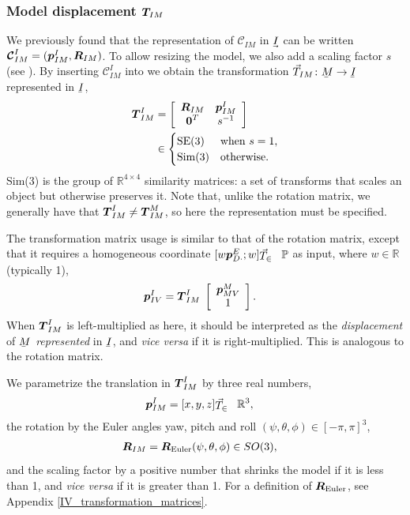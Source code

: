 \subsubsection{Model displacement $\boldsymbol{T}_{\!IM}$}

We previously found that the representation of $\mathcal{C}_{IM}$ in $\uvec{I}$ can be written $\boldsymbol{\mathcal{C}}_{IM}^I = (\boldsymbol{p}_{IM}^I,\boldsymbol{R}_{IM})$. To allow resizing the model, we also add a scaling factor $s$ (see ). By inserting $\boldsymbol{\mathcal{C}}_{IM}^I$ into  we obtain the transformation $\vec{T}_{IM}\colon \ubar{M}\to\ubar{I}$ represented in $\ubar{I}$,
%
\begin{align}
\dvec{T}_{IM}^I &= 
\left[\begin{array}{c c}
 \mat{R}_{IM}  & \dvec{p}_{IM}^I \\%
 \dvec{0}^T  &  s^{-1}
\end{array}\right] \nn &\in
\begin{cases}
\mathrm{SE}(3) & \mathrm{when}\ s=1,\\
\mathrm{Sim}(3) & \mathrm{otherwise}.
\end{cases} \label{eq_T_IM}
\end{align}
%
Sim(3) is the group of $\mathbb{R}^{4\times4}$ similarity matrices: a set of transforms that scales an object but otherwise preserves it. Note that, unlike the rotation matrix, we generally have that $\boldsymbol{T}_{IM}^I \ne \boldsymbol{T}_{IM}^M$, so here the representation must be specified.

The transformation matrix usage is similar to that of the rotation matrix, except that it requires a homogeneous coordinate $[w\dvec{p}_{D\cdot}^E;w]\T\in\mathbb{P}$ as input, where $w\in\mathbb{R}$ (typically 1),
%
\begin{align}
\boldsymbol{p}_{IV}^I &= \boldsymbol{T}_{IM}^I\; 
\left[\begin{array}{c}\boldsymbol{p}_{MV}^M \\ 1
\end{array}\right].
\end{align}
%
When $\boldsymbol{T}_{IM}^I$ is left-multiplied as here, it should be interpreted as the \emph{displacement} of $\ubar{M}$ \emph{represented} in $\ubar{I}$, and \emph{vice versa} if it is right-multiplied. This is analogous to the rotation matrix. 

We parametrize the translation in $\boldsymbol{T}_{IM}^I$ by three real numbers,
%
\begin{align}
\dvec{p}_{IM}^I &= [x,y,z]\T \in \mathbb{R}^3,
\end{align}
%
the rotation by the Euler angles yaw, pitch and roll $(\psi,\theta,\phi) \in [-\pi,\pi]^3$,
%
\begin{align}
\boldsymbol{R}_{IM}    &= \boldsymbol{R}_{\mathrm{Euler}}(\psi,\theta,\phi) \in SO(3),
\end{align}
%
and the scaling factor by a positive number that shrinks the model if it is less than 1, and \emph{vice versa} if it is greater than 1. For a definition of $\boldsymbol{R}_{\mathrm{Euler}}$, see Appendix \ref{IV_transformation_matrices}.



